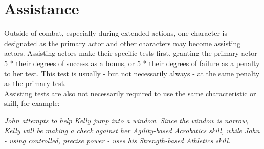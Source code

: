 \documentclass[12pt,a4paper,openany,dvipsnames]{book}
\begin{document}
	\section{Assistance}
	Outside of combat, especially during extended actions,
		one character is designated as the primary actor and other characters may become assisting actors.
	Assisting actors make their specific tests first,
		granting the primary actor 5 * their degrees of success as a bonus,
		or 5 * their degrees of failure as a penalty to her test.
	This test is usually - but not necessarily always - at the same penalty as the primary test.
	\\%
	Assisting tests are also not necessarily required to use the same characteristic or skill, for example:\par
	\begin{exampleblock}
		\itshape
		John attempts to help Kelly jump into a window.
		Since the window is narrow,
			Kelly will be making a check against her \emph{Agility}-based Acrobatics skill,
			while John - using controlled, precise power - uses his \emph{Strength}-based Athletics skill.
	\end{exampleblock}
\end{document}
